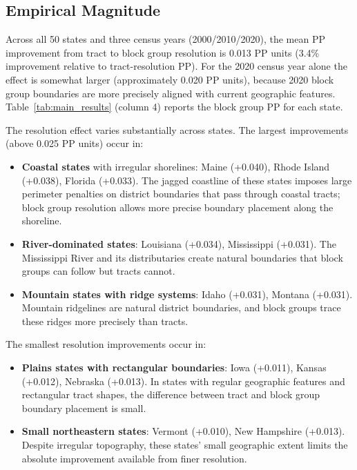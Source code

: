 \subsection{Empirical Magnitude}

Across all 50 states and three census years (2000/2010/2020), the mean PP improvement from tract to block group resolution is 0.013 PP units (3.4\% improvement relative to tract-resolution PP). For the 2020 census year alone the effect is somewhat larger (approximately 0.020 PP units), because 2020 block group boundaries are more precisely aligned with current geographic features. Table~\ref{tab:main_results} (column 4) reports the block group PP for each state.

The resolution effect varies substantially across states. The largest improvements (above 0.025 PP units) occur in:
\begin{itemize}
\item \textbf{Coastal states} with irregular shorelines: Maine (+0.040), Rhode Island (+0.038), Florida (+0.033). The jagged coastline of these states imposes large perimeter penalties on district boundaries that pass through coastal tracts; block group resolution allows more precise boundary placement along the shoreline.
\item \textbf{River-dominated states}: Louisiana (+0.034), Mississippi (+0.031). The Mississippi River and its distributaries create natural boundaries that block groups can follow but tracts cannot.
\item \textbf{Mountain states with ridge systems}: Idaho (+0.031), Montana (+0.031). Mountain ridgelines are natural district boundaries, and block groups trace these ridges more precisely than tracts.
\end{itemize}

The smallest resolution improvements occur in:
\begin{itemize}
\item \textbf{Plains states with rectangular boundaries}: Iowa (+0.011), Kansas (+0.012), Nebraska (+0.013). In states with regular geographic features and rectangular tract shapes, the difference between tract and block group boundary placement is small.
\item \textbf{Small northeastern states}: Vermont (+0.010), New Hampshire (+0.013). Despite irregular topography, these states' small geographic extent limits the absolute improvement available from finer resolution.
\end{itemize}

